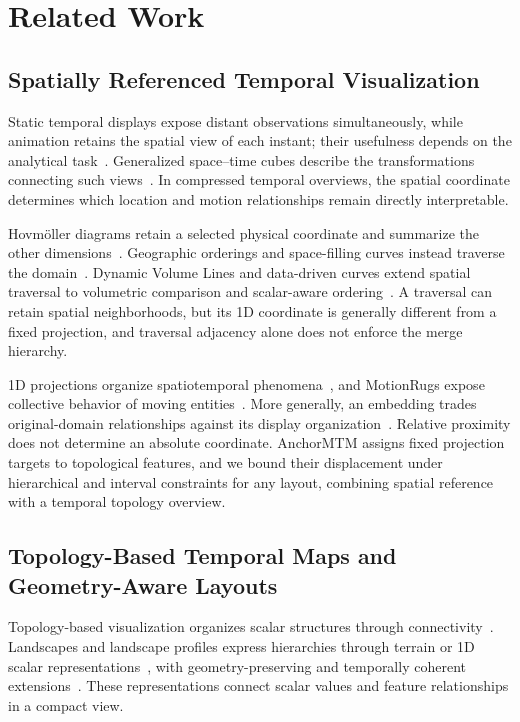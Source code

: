 \documentclass[review]{vgtc}
\begin{document}
\section{Related Work}\label{sec:related}
\subsection{Spatially Referenced Temporal Visualization}
Static temporal displays expose distant observations simultaneously, while animation retains the spatial view of each instant; their usefulness depends on the analytical task~\cite{Tversky:2002:Animation,Robertson:2008:Animation}. Generalized space--time cubes describe the transformations connecting such views~\cite{Bach:2017:STC}. In compressed temporal overviews, the spatial coordinate determines which location and motion relationships remain directly interpretable.

Hovm\"oller diagrams retain a selected physical coordinate and summarize the other dimensions~\cite{Hovmoller:1949}. Geographic orderings and space-filling curves instead traverse the domain~\cite{Guo:2006:SpatialOrder,Dafner:2000:CSFC}. Dynamic Volume Lines and data-driven curves extend spatial traversal to volumetric comparison and scalar-aware ordering~\cite{Weissenboeck:2019:DVL,Zhou:2021:DSF}. A traversal can retain spatial neighborhoods, but its 1D coordinate is generally different from a fixed projection, and traversal adjacency alone does not enforce the merge hierarchy.

1D projections organize spatiotemporal phenomena~\cite{Franke:2021:1DP}, and MotionRugs expose collective behavior of moving entities~\cite{Buchmueller:2019:MR}. More generally, an embedding trades original-domain relationships against its display organization~\cite{Nonato:2019:MP}. Relative proximity does not determine an absolute coordinate. AnchorMTM assigns fixed projection targets to topological features, and we bound their displacement under hierarchical and interval constraints for any layout, combining spatial reference with a temporal topology overview.

\subsection{Topology-Based Temporal Maps and Geometry-Aware Layouts}
Topology-based visualization organizes scalar structures through connectivity~\cite{Heine:2016:Survey}. Landscapes and landscape profiles express hierarchies through terrain or 1D scalar representations~\cite{Weber:2007:TL,Oesterling:2013:TLP}, with geometry-preserving and temporally coherent extensions~\cite{Beketayev:2012:GPTL,Herick:2020:TCTL}. These representations connect scalar values and feature relationships in a compact view.
\end{document}
